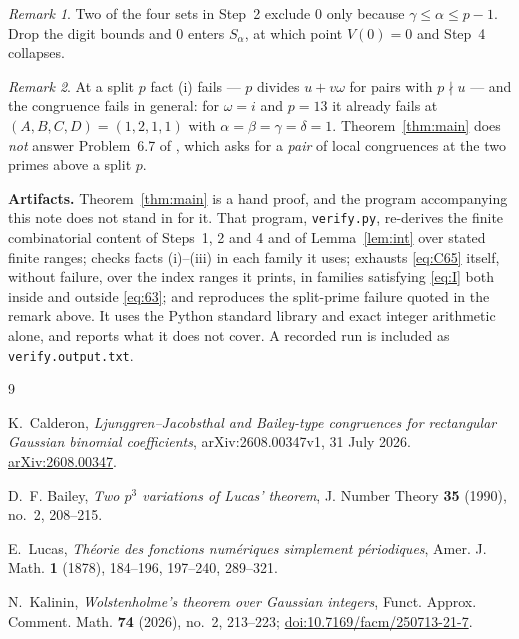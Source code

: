 \documentclass[11pt]{amsart}
\theoremstyle{remark}
\newtheorem*{remark}{Remark}
\begin{document}
\begin{remark}
Two of the four sets in Step~2 exclude $0$ only because
$\gamma\le\alpha\le p-1$. Drop the digit bounds and $0$ enters
$S_{\alpha}$, at which point $V(0)=0$ and Step~4 collapses.
\end{remark}

\begin{remark}
At a split $p$ fact (i) fails --- $p$ divides $u+v\omega$ for pairs with
$p\nmid u$ --- and the congruence fails in general: for $\omega=i$ and
$p=13$ it already fails at $(A,B,C,D)=(1,2,1,1)$ with
$\alpha=\beta=\gamma=\delta=1$. Theorem~\ref{thm:main} does \emph{not}
answer Problem~6.7 of \cite{Calderon}, which asks for a \emph{pair} of
local congruences at the two primes above a split $p$.
\end{remark}

\medskip
\noindent\textbf{Artifacts.}
Theorem~\ref{thm:main} is a hand proof, and the program accompanying this
note does not stand in for it. That program, \texttt{verify.py}, re-derives
the finite combinatorial content of Steps~1, 2 and 4 and of
Lemma~\ref{lem:int} over stated finite ranges; checks facts (i)--(iii) in
each family it uses; exhausts \eqref{eq:C65} itself, without failure, over
the index ranges it prints, in families satisfying \eqref{eq:I} both
inside and outside \eqref{eq:63}; and reproduces the split-prime failure
quoted in the remark above. It uses the Python standard library and exact
integer arithmetic alone, and reports what it does not cover. A recorded
run is included as \texttt{verify.output.txt}.

\begin{thebibliography}{9}

K.~Calderon,
\emph{Ljunggren--Jacobsthal and Bailey-type congruences for rectangular
Gaussian binomial coefficients},
arXiv:2608.00347v1, 31 July 2026.
\href{https://arxiv.org/abs/2608.00347}{arXiv:2608.00347}.

D.~F. Bailey,
\emph{Two $p^{3}$ variations of Lucas' theorem},
J. Number Theory \textbf{35} (1990), no.~2, 208--215.

E.~Lucas,
\emph{Th\'eorie des fonctions num\'eriques simplement p\'eriodiques},
Amer. J. Math. \textbf{1} (1878), 184--196, 197--240, 289--321.

N.~Kalinin,
\emph{Wolstenholme's theorem over Gaussian integers},
Funct. Approx. Comment. Math. \textbf{74} (2026), no.~2, 213--223;
\href{https://doi.org/10.7169/facm/250713-21-7}
{doi:10.7169/facm/250713-21-7}.

\end{thebibliography}
\end{document}
